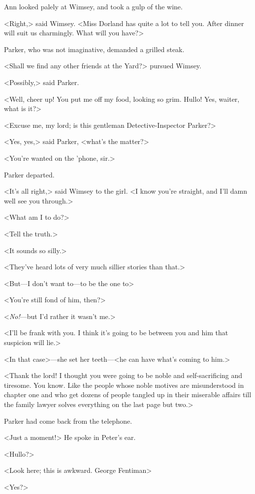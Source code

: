 Ann looked palely at Wimsey, and took a gulp of the wine.

<Right,> said Wimsey. <Miss Dorland has quite a lot to tell you. After dinner will suit us charmingly. What will you have?>

Parker, who was not imaginative, demanded a grilled steak.

<Shall we find any other friends at the Yard?> pursued Wimsey.

<Possibly,> said Parker.

<Well, cheer up! You put me off my food, looking so grim. Hullo! Yes, waiter, what is it?>

<Excuse me, my lord; is this gentleman Detective-Inspector Parker?>

<Yes, yes,> said Parker, <what's the matter?>

<You're wanted on the 'phone, sir.>

Parker departed.

<It's all right,> said Wimsey to the girl. <I know you're straight, and I'll damn well see you through.>

<What am I to do?>

<Tell the truth.>

<It sounds so silly.>

<They've heard lots of very much sillier stories than that.>

<But—I don't want to—to be the one to\longdash>

<You're still fond of him, then?>

<\emph{No!}—but I'd rather it wasn't me.>

<I'll be frank with you. I think it's going to be between you and him that suspicion will lie.>

<In that case>—she set her teeth—<he can have what's coming to him.>

<Thank the lord! I thought you were going to be noble and self-sacrificing and tiresome. You know. Like the people whose noble motives are misunderstood in chapter one and who get dozens of people tangled up in their miserable affairs till the family lawyer solves everything on the last page but two.>

Parker had come back from the telephone.

<Just a moment!> He spoke in Peter's ear.

<Hullo?>

<Look here; this is awkward. George Fentiman\longdash>

<Yes?>

